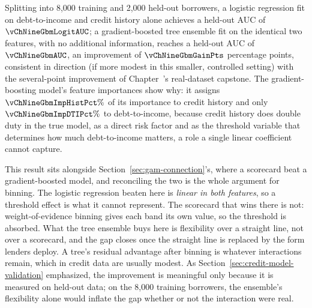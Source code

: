 \documentclass[../ai_in_finance]{subfiles}
\begin{document}
Splitting into 8,000 training and 2,000 held-out borrowers, a logistic regression fit on debt-to-income and credit history alone achieves a held-out AUC of $\vChNineGbmLogitAUC$; a gradient-boosted tree ensemble fit on the identical two features, with no additional information, reaches a held-out AUC of $\vChNineGbmAUC$, an improvement of $\vChNineGbmGainPts$ percentage points, consistent in direction (if more modest in this smaller, controlled setting) with the several-point improvement of Chapter~'s real-dataset capstone. The gradient-boosting model's feature importances show why: it assigns $\vChNineGbmImpHistPct\%$ of its importance to credit history and only $\vChNineGbmImpDTIPct\%$ to debt-to-income, because credit history does double duty in the true model, as a direct risk factor and as the threshold variable that determines how much debt-to-income matters, a role a single linear coefficient cannot capture.

This result sits alongside Section~\ref{sec:gam-connection}'s, where a scorecard beat a gradient-boosted model, and reconciling the two is the whole argument for binning. The logistic regression beaten here is \emph{linear in both features}, so a threshold effect is what it cannot represent. The scorecard that wins there is not: weight-of-evidence binning gives each band its own value, so the threshold is absorbed. What the tree ensemble buys here is flexibility over a straight line, not over a scorecard, and the gap closes once the straight line is replaced by the form lenders deploy. A tree's residual advantage after binning is whatever interactions remain, which in credit data are usually modest.
As Section~\ref{sec:credit-model-validation} emphasized, the improvement is meaningful only because it is measured on held-out data; on the 8,000 training borrowers, the ensemble's flexibility alone would inflate the gap whether or not the interaction were real.
\end{document}
